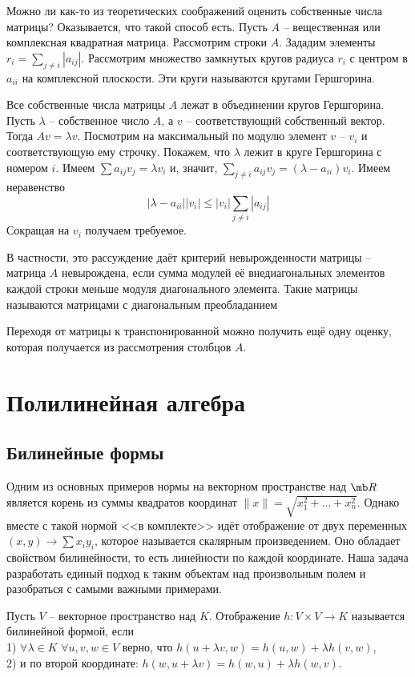 Можно ли как-то из теоретических соображений оценить собственные числа матрицы? Оказывается, что такой способ есть. Пусть $A$ -- вещественная или комплексная квадратная матрица. Рассмотрим строки $A$. Зададим элементы $r_i=\sum_{j\neq i} |a_{ij}|$. Рассмотрим множество замкнутых кругов радиуса $r_i$ с центром в $a_{ii}$ на комплексной плоскости. Эти круги называются кругами Гершгорина. 

\utv Все собственные числа матрицы $A$ лежат в объединении кругов Гершгорина. 
\eutv
\proof Пусть $\lambda$ -- собственное число $A$, а $v$ -- соответствующий собственный вектор. Тогда $Av=\lambda v$. Посмотрим на максимальный по модулю элемент $v$ -- $v_i$ и соответствующую ему строчку. Покажем, что $\lambda$ лежит в круге Гершгорина с номером $i$. Имеем $\sum a_{ij}v_j =\lambda v_i$  и, значит, $\sum_{j\neq i} a_{ij}v_j= (\lambda - a_{ii})v_i $. Имеем неравенство $$|\lambda -a_{ii}||v_i| \leq |v_i|\sum_{j\neq i} |a_{ij}|$$
Сокращая на $v_i$ получаем требуемое. 
\endproof

\rm В частности, это рассуждение даёт критерий невырожденности матрицы -- матрица $A$ невырождена, если сумма модулей её внедиагональных элементов каждой строки меньше модуля диагонального элемента. Такие матрицы называются матрицами с диагональным преобладанием
\erm

\rm
Переходя от матрицы к транспонированной можно получить ещё одну оценку, которая получается из рассмотрения столбцов $A$.
\erm


\chapter{Полилинейная алгебра}

\section{Билинейные формы}

Одним из основных примеров нормы на векторном пространстве над $\mb R$ является корень из суммы квадратов координат $\|x\|=\sqrt{x_1^2+\dots +x_n^2}$. Однако вместе с такой нормой <<в комплекте>> идёт отображение от двух переменных $(x,y) \to \sum x_iy_i$, которое называется скалярным произведением. Оно обладает свойством билинейности, то есть линейности по каждой координате. Наша задача разработать единый подход к таким объектам над произвольным полем и разобраться с самыми важными примерами.

\dfn Пусть $V$ -- векторное пространство над $K$. Отображение $h\colon V\times V \to K$ называется билинейной формой, если\\
1) $\forall \lambda \in K$ $\forall u,v,w \in V$ верно, что $h(u+\lambda v, w) = h(u,w)+\lambda h(v,w)$,\\
2) и по второй координате: $h( w, u+\lambda v) = h(w,u)+\lambda h(w,v)$.
\edfn

